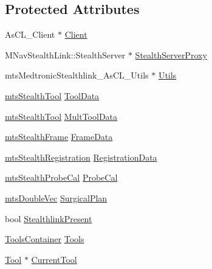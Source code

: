 \subsection*{Protected Attributes}
\begin{DoxyCompactItemize}
\item 
As\-C\-L\-\_\-\-Client $\ast$ \hyperlink{classmts_medtronic_stealthlink_a1330ec37490335ecddccec758efd763c}{Client}
\item 
M\-Nav\-Stealth\-Link\-::\-Stealth\-Server $\ast$ \hyperlink{classmts_medtronic_stealthlink_a8b38a61b23060e7f601e1736d7072804}{Stealth\-Server\-Proxy}
\item 
mts\-Medtronic\-Stealthlink\-\_\-\-As\-C\-L\-\_\-\-Utils $\ast$ \hyperlink{classmts_medtronic_stealthlink_ab6970edff3db4896a9cce824323f3c3e}{Utils}
\item 
\hyperlink{classmts_stealth_tool}{mts\-Stealth\-Tool} \hyperlink{classmts_medtronic_stealthlink_aacf8237d9bfdc92bda9296875469b23a}{Tool\-Data}
\item 
\hyperlink{classmts_stealth_tool}{mts\-Stealth\-Tool} \hyperlink{classmts_medtronic_stealthlink_ae9ec69cddab3fbe60851cdb37b77f1ad}{Mult\-Tool\-Data}
\item 
\hyperlink{classmts_stealth_frame}{mts\-Stealth\-Frame} \hyperlink{classmts_medtronic_stealthlink_a063e3d22d099f48291852d9f0557fcdf}{Frame\-Data}
\item 
\hyperlink{classmts_stealth_registration}{mts\-Stealth\-Registration} \hyperlink{classmts_medtronic_stealthlink_a199da265ece19f82bd552db08f0e1f6e}{Registration\-Data}
\item 
\hyperlink{classmts_stealth_probe_cal}{mts\-Stealth\-Probe\-Cal} \hyperlink{classmts_medtronic_stealthlink_a0a1b2f32b469292811f9d1b8822c9c7b}{Probe\-Cal}
\item 
\hyperlink{mts_vector_8h_af69167a5dc2ad33eb93965b9387d8403}{mts\-Double\-Vec} \hyperlink{classmts_medtronic_stealthlink_ae24546a408ca0acb2dc6ccd4c42578b0}{Surgical\-Plan}
\item 
bool \hyperlink{classmts_medtronic_stealthlink_a42444da9be77b2b040660fea34bc9690}{Stealthlink\-Present}
\item 
\hyperlink{classmts_medtronic_stealthlink_ab6218cf1cbe807b4cc2cc262528e7ae9}{Tools\-Container} \hyperlink{classmts_medtronic_stealthlink_acb4d5215e055c4c39c62d3a06259ccb4}{Tools}
\item 
\hyperlink{classmts_medtronic_stealthlink_1_1_tool}{Tool} $\ast$ \hyperlink{classmts_medtronic_stealthlink_a4411bd7e0677a6acecedd426640ecbc8}{Current\-Tool}

\end{DoxyCompactItemize}
